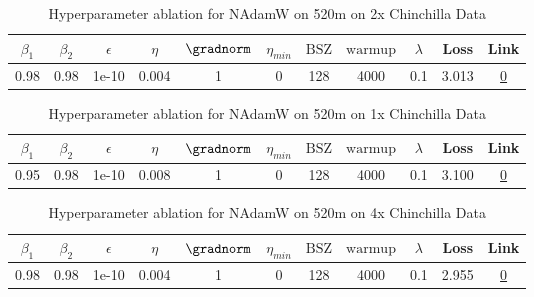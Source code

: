 \begin{table}[H]
\centering
\caption{Hyperparameter ablation for NAdamW on 520m on 2x Chinchilla Data}
\label{tab:ablation_nadamw_520m_2}
\begin{tabular}{ccccccccccc}
\toprule
$\beta_1$ & $\beta_2$ & $\epsilon$ & $\eta$ & $\gradnorm$ & $\eta_{min}$ & $\mathrm{BSZ}$ & $\mathrm{warmup}$ & $\lambda$ & Loss & Link \\
\midrule
0.98 & 0.98 & 1e-10 & 0.004 & 1 & 0 & 128 & 4000 & 0.1 & 3.013 & \href{https://wandb.ai/stanford-mercury/optimizer-scaling/runs/sweep-520m-21B-nadamw0a1fe6lr0.004-wd0.1-minlr0-warmup4000-b10.9-2d3f42}{0} \\
\midrule
\bottomrule
\end{tabular}
\end{table}

\begin{table}[H]
\centering
\caption{Hyperparameter ablation for NAdamW on 520m on 1x Chinchilla Data}
\label{tab:ablation_nadamw_520m_1}
\begin{tabular}{ccccccccccc}
\toprule
$\beta_1$ & $\beta_2$ & $\epsilon$ & $\eta$ & $\gradnorm$ & $\eta_{min}$ & $\mathrm{BSZ}$ & $\mathrm{warmup}$ & $\lambda$ & Loss & Link \\
\midrule
0.95 & 0.98 & 1e-10 & 0.008 & 1 & 0 & 128 & 4000 & 0.1 & 3.100 & \href{https://wandb.ai/stanford-mercury/optimizer-scaling/runs/sweep-520m-10B-nadamwd3819dlr0.008-wd0.1-minlr0-warmup4000-b10.9-b6c23d}{0} \\
\midrule
\bottomrule
\end{tabular}
\end{table}

\begin{table}[H]
\centering
\caption{Hyperparameter ablation for NAdamW on 520m on 4x Chinchilla Data}
\label{tab:ablation_nadamw_520m_4}
\begin{tabular}{ccccccccccc}
\toprule
$\beta_1$ & $\beta_2$ & $\epsilon$ & $\eta$ & $\gradnorm$ & $\eta_{min}$ & $\mathrm{BSZ}$ & $\mathrm{warmup}$ & $\lambda$ & Loss & Link \\
\midrule
0.98 & 0.98 & 1e-10 & 0.004 & 1 & 0 & 128 & 4000 & 0.1 & 2.955 & \href{https://wandb.ai/stanford-mercury/optimizer-scaling/runs/sweep-520m-42B-nadamwcf9d95lr0.004-wd0.1-minlr0-warmup4000-b10.9-40428f}{0} \\
\midrule
\bottomrule
\end{tabular}
\end{table}

